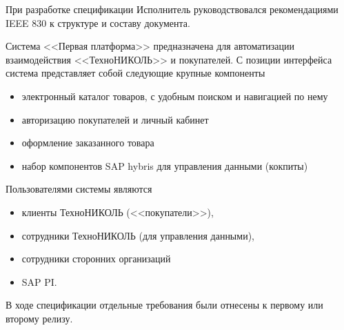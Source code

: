 

%



При разработке спецификации Исполнитель руководствовался рекомендациями IEEE 830 к структуре и составу документа.


Система <<Первая платформа>> предназначена для автоматизации взаимодействия <<ТехноНИКОЛЬ>> и покупателей. С позиции интерфейса система представляет собой следующие крупные компоненты 
\begin{itemize}
\item электронный каталог товаров, с удобным поиском и навигацией по нему 
\item авторизацию покупателей и личный кабинет
\item оформление заказанного товара
\item набор компонентов SAP hybris для управления данными (кокпиты)
\end{itemize}


Пользователями системы являются 
\begin{itemize}
\item клиенты ТехноНИКОЛЬ (<<покупатели>>), 
\item сотрудники ТехноНИКОЛЬ (для управления данными),
\item сотрудники сторонних организаций
\item SAP PI.
\end{itemize}


В ходе спецификации отдельные требования были отнесены к первому или второму релизу. 